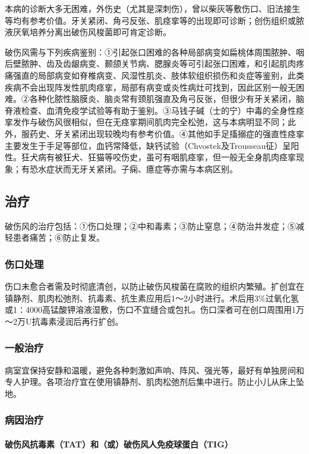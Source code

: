 本病的诊断大多无困难，外伤史（尤其是深刺伤），曾以柴灰等敷伤口、旧法接生等均有参考价值。牙关紧闭、角弓反张、肌痉挛等的出现即可诊断；创伤组织或脓液厌氧培养分离出破伤风梭菌即可肯定诊断。

破伤风需与下列疾病鉴别：①引起张口困难的各种局部病变如扁桃体周围脓肿、咽后壁脓肿、齿及齿龈病变、颞颌关节病、腮腺炎等可引起张口困难，和引起肌肉疼痛强直的局部病变如脊椎病变、风湿性肌炎、肢体软组织损伤和炎症等鉴别，此类疾病不会出现阵发性肌肉痉挛，局部有病变或炎性病灶可找到，因此区别一般无困难。②各种化脓性脑膜炎、脑炎常有颈肌强直及角弓反张，但很少有牙关紧闭，脑脊液检查、血清免疫学试验等有助于鉴别。③马钱子碱（士的宁）中毒的全身性痉挛发作与破伤风很相似，但在无痉挛期间肌肉完全松弛，这与本病明显不同；此外，服药史、牙关紧闭出现较晚均有参考价值。④其他如手足搐搦症的强直性痉挛主要发生于手足等部位，血钙常降低，缺钙试验（Chvostek及Trousseau征）呈阳性。狂犬病有被狂犬、狂猫等咬伤史，虽可有咽肌痉挛，但一般无全身肌肉痉挛现象；有恐水症状而无牙关紧闭。子痫、癔症等亦需与本病区别。

\subsection{治疗}

破伤风的治疗包括：①伤口处理；②中和毒素；③防止窒息；④防治并发症；⑤减轻患者痛苦；⑥防止复发。

\subsubsection{伤口处理}

伤口未愈合者需及时彻底清创，以防止破伤风梭菌在腐败的组织内繁殖。扩创宜在镇静剂、肌肉松弛剂、抗毒素、抗生素应用后1～2小时进行。术后用3\%过氧化氢或1∶4000高锰酸钾溶液湿敷，伤口不宜缝合或包扎。伤口深者可在创口周围用1万～2万U抗毒素浸润后再行扩创。

\subsubsection{一般治疗}

病室宜保持安静和温暖，避免各种刺激如声响、阵风、强光等，最好有单独房间和专人护理。各项治疗宜在使用镇静剂、肌肉松弛剂后集中进行。防止小儿从床上坠地。

\subsubsection{病因治疗}

\paragraph{破伤风抗毒素（TAT）和（或）破伤风人免疫球蛋白（TIG）}

